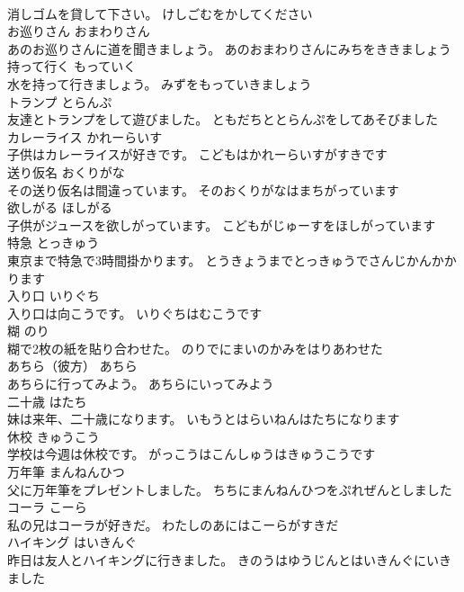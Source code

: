 \documentclass[8pt]{extreport}
\begin{document}
\begin{CJK}{UTF8}{min}
\\	消しゴムを貸して下さい。	けしごむをかしてください	
\\	お巡りさん	おまわりさん	
\\	あのお巡りさんに道を聞きましょう。	あのおまわりさんにみちをききましょう	
\\	持って行く	もっていく	
\\	水を持って行きましょう。	みずをもっていきましょう	
\\	トランプ	とらんぷ	
\\	友達とトランプをして遊びました。	ともだちととらんぷをしてあそびました	
\\	カレーライス	かれーらいす	
\\	子供はカレーライスが好きです。	こどもはかれーらいすがすきです	
\\	送り仮名	おくりがな	
\\	その送り仮名は間違っています。	そのおくりがなはまちがっています	
\\	欲しがる	ほしがる	
\\	子供がジュースを欲しがっています。	こどもがじゅーすをほしがっています	
\\	特急	とっきゅう	
\\	東京まで特急で3時間掛かります。	とうきょうまでとっきゅうでさんじかんかかります	
\\	入り口	いりぐち	
\\	入り口は向こうです。	いりぐちはむこうです	
\\	糊	のり	
\\	糊で2枚の紙を貼り合わせた。	のりでにまいのかみをはりあわせた	
\\	あちら（彼方）	あちら	
\\	あちらに行ってみよう。	あちらにいってみよう	
\\	二十歳	はたち	
\\	妹は来年、二十歳になります。	いもうとはらいねんはたちになります	
\\	休校	きゅうこう	
\\	学校は今週は休校です。	がっこうはこんしゅうはきゅうこうです	
\\	万年筆	まんねんひつ	
\\	父に万年筆をプレゼントしました。	ちちにまんねんひつをぷれぜんとしました	
\\	コーラ	こーら	
\\	私の兄はコーラが好きだ。	わたしのあにはこーらがすきだ	
\\	ハイキング	はいきんぐ	
\\	昨日は友人とハイキングに行きました。	きのうはゆうじんとはいきんぐにいきました	

\end{CJK}
\end{document}
